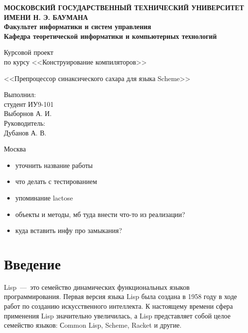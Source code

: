 \documentclass[12pt,a4paper,oneside]{extarticle}
\begin{document}
\pgfplotsset{compat=1.8}

\thispagestyle{empty}
\newpage
{
\centering


\textbf{
МОСКОВСКИЙ ГОСУДАРСТВЕННЫЙ ТЕХНИЧЕСКИЙ УНИВЕРСИТЕТ ИМЕНИ Н. Э. БАУМАНА \\
Факультет информатики и систем управления \\
Кафедра теоретической информатики и компьютерных технологий}
\bigskip
\bigskip
\bigskip
\bigskip
\bigskip
\bigskip
\bigskip

\vfill


Курсовой проект \\
по курсу <<Конструирование компиляторов>>

\bigskip

{\large <<Препроцессор синаксического сахара для языка Scheme>>}
\bigskip

\vfill



\hfill\parbox{4cm} {
Выполнил:\\
студент ИУ9-101 \hfill \\
Выборнов А. И.\hfill \medskip\\
Руководитель:\\
Дубанов А. В.\hfill
}


\vspace{\fill}

Москва \number\year
\clearpage
}


\tableofcontents

\clearpage

\begin{itemize}
    \item уточнить название работы
    \item что делать с тестированием
    \item упоминание lactose
    \item объекты и методы, мб туда внести что-то из реализации?
    \item куда вставить инфу про замыкания?
\end{itemize}

\clearpage

\section*{Введение}
    Lisp~---~это семейство динамических функциональных языков программирования.
    Первая версия языка Lisp была создана в 1958 году в ходе работ по созданию искусственного интеллекта.
    К настоящему времени сфера применения Lisp значительно увеличилась, а Lisp представляет собой целое семейство языков: Сommon Lisp, Scheme, Racket и другие. 
\end{document}
